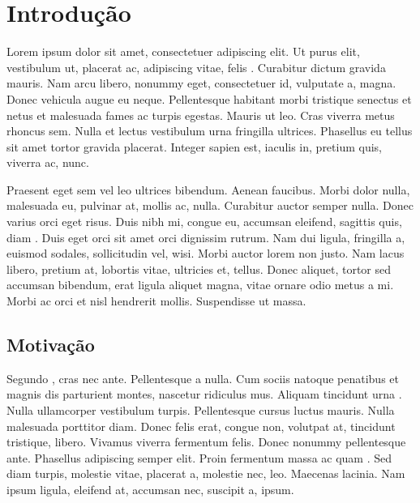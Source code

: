 %
%

\chapter{Introdu\c{c}\~{a}o}
Lorem ipsum dolor sit amet, consectetuer adipiscing elit. Ut purus elit, vestibulum ut, placerat ac, adipiscing vitae, felis \citep{Salles2014}. Curabitur dictum gravida mauris. Nam arcu libero, nonummy eget, consectetuer id, vulputate a, magna. Donec vehicula augue eu neque. Pellentesque habitant morbi tristique senectus et netus et malesuada fames ac turpis egestas. Mauris ut leo. Cras viverra metus rhoncus sem. Nulla et lectus vestibulum urna fringilla ultrices. Phasellus eu tellus sit amet tortor gravida placerat. Integer sapien est, iaculis in, pretium quis, viverra ac, nunc.

Praesent eget sem vel leo ultrices bibendum. Aenean faucibus. Morbi dolor nulla, malesuada eu, pulvinar at, mollis ac, nulla. Curabitur auctor semper nulla. Donec varius orci eget risus. Duis nibh mi, congue eu, accumsan eleifend, sagittis quis, diam \citep{Justel2014}. Duis eget orci sit amet orci dignissim rutrum. Nam dui ligula, fringilla a, euismod sodales, sollicitudin vel, wisi. Morbi auctor lorem non justo. Nam lacus libero, pretium at, lobortis vitae, ultricies et, tellus. Donec aliquet, tortor sed accumsan bibendum, erat ligula aliquet magna, vitae ornare odio metus a mi. Morbi ac orci et nisl hendrerit mollis. Suspendisse ut massa.

\section{Motiva\c{c}\~{a}o}
Segundo \citet{Goldschmidt2005}, cras nec ante. Pellentesque a nulla. Cum sociis natoque penatibus et magnis dis parturient montes, nascetur ridiculus mus. Aliquam tincidunt urna \citep{Rakocevic2014}. Nulla ullamcorper vestibulum turpis. Pellentesque cursus luctus mauris. Nulla malesuada porttitor diam. Donec felis erat, congue non, volutpat at, tincidunt tristique, libero. Vivamus viverra fermentum felis. Donec nonummy pellentesque ante. Phasellus adipiscing semper elit. Proin fermentum massa ac quam \citep{Lara2014}. Sed diam turpis, molestie vitae, placerat a, molestie nec, leo. Maecenas lacinia. Nam ipsum ligula, eleifend at, accumsan nec, suscipit a, ipsum.

